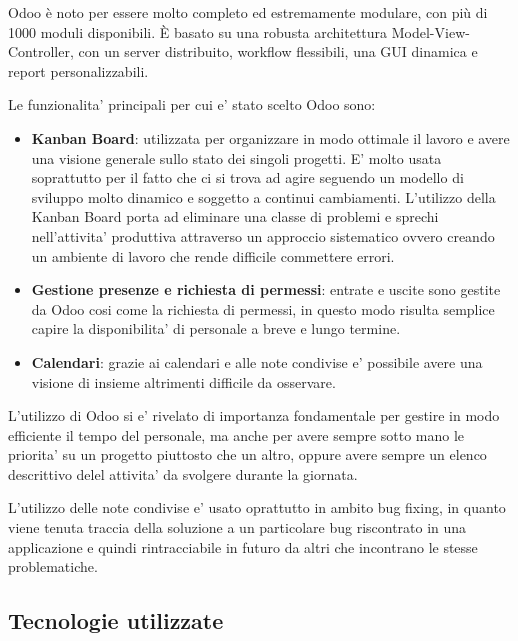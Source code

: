 Odoo è noto per essere molto completo ed estremamente modulare, con più di 1000 moduli disponibili. È basato su una robusta architettura Model-View-Controller, con un server distribuito, workflow flessibili, una GUI dinamica e report personalizzabili.

Le funzionalita' principali per cui e' stato scelto Odoo sono:

\begin{itemize}
	\item \textbf{Kanban Board}: utilizzata per organizzare in modo ottimale il lavoro e avere una visione generale sullo stato dei singoli progetti. E' molto usata soprattutto per il fatto che ci si trova ad agire seguendo un modello di sviluppo molto dinamico e soggetto a continui cambiamenti. L'utilizzo della Kanban Board porta ad eliminare una classe di problemi e sprechi nell'attivita' produttiva attraverso un approccio sistematico ovvero creando un ambiente di lavoro che rende difficile commettere errori.
	
	\item \textbf{Gestione presenze e richiesta di permessi}: entrate e uscite sono gestite da Odoo cosi come la richiesta di permessi, in questo modo risulta semplice capire la disponibilita' di personale a breve e lungo termine.
	
	\item \textbf{Calendari}: grazie ai calendari e alle note condivise e' possibile avere una visione di insieme altrimenti difficile da osservare.	

\end{itemize}

L'utilizzo di Odoo si e' rivelato di importanza fondamentale per gestire in modo efficiente il tempo del personale, ma anche per avere sempre sotto mano le priorita' su un progetto piuttosto che un altro, oppure avere sempre un elenco descrittivo delel attivita' da svolgere durante la giornata.

L'utilizzo delle note condivise e' usato oprattutto in ambito bug fixing, in quanto viene tenuta traccia della soluzione a un particolare bug riscontrato in una applicazione e quindi rintracciabile in futuro da altri che incontrano le stesse problematiche.

\subsection{Tecnologie utilizzate}

